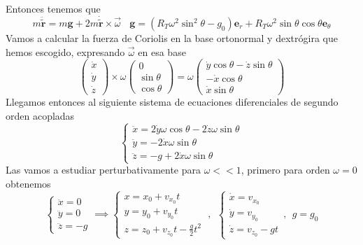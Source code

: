 Entonces tenemos que
\begin{equation} \label{6.1.1}
    m\ddot{\tilde{\mathbf{r}}}=  m\mathbf{g} + 2 m \dot{\tilde{\mathbf{r}}} \times  \vec{\omega} \ \ \ \ \mathbf{g} = \left(R_T\omega^2\sin^2\theta-g_0\right) \mathbf{e}_r + R_T\omega^2 \sin \theta \cos \theta \mathbf{e}_\theta 
\end{equation} 
Vamos a calcular la fuerza de Coriolis en la base ortonormal y dextrógira que hemos escogido, expresando $\vec{\omega}$ en esa base
\begin{equation} \label{6.1.1}
    \left(\begin{matrix}
        \dot{x} \\ \dot{y} \\ \dot{z}
    \end{matrix}\right) \times \omega \left(\begin{matrix}
        0 \\  \sin\theta \\ \cos \theta
    \end{matrix}\right) = \omega \left(\begin{matrix}
        \dot{y}\cos\theta -\dot{z}\sin\theta \\  -\dot{x}\cos\theta \\ \dot{x}\sin\theta
    \end{matrix}\right)
\end{equation} 
Llegamos entonces al siguiente sistema de ecuaciones diferenciales de segundo orden acopladas
\begin{equation} \label{6.1.1}
\left\{\begin{matrix}
  \ddot{x} = 2\dot{y}\omega\cos\theta -2\dot{z}\omega\sin\theta\\
  \ddot{y} = -2\dot{x}\omega \sin\theta \phantom{----,,}\\
  \ddot{z} = -g + 2\dot{x}\omega \sin\theta \phantom{---}
\end{matrix}\right.
\end{equation} 
Las vamos a estudiar perturbativamente para $\omega<<1$, primero para orden $\omega = 0$ obtenemos
\begin{equation} \label{6.1.1}
    \left\{\begin{matrix}
      \ddot{x} = 0\\
      \ddot{y} = 0\\
      \ddot{z} = -g
    \end{matrix}\right. \implies
    \left\{\begin{matrix}
        x = x_0 + v_{x_0}t\phantom{--,,}\\
        y = y_0 + v_{y_0}t\phantom{--,,}\\
        z = z_0 + v_{z_0}t-\frac{g}{2}t^2
      \end{matrix}\right. , \ \ 
    \left\{\begin{matrix}
    \dot{x} = v_{x_0}\phantom{--,}\\
    \dot{y} = v_{y_0}\phantom{--,}\\
    \dot{z} = v_{z_0}-gt
    \end{matrix}\right. , \ \ g=g_0
\end{equation} 
